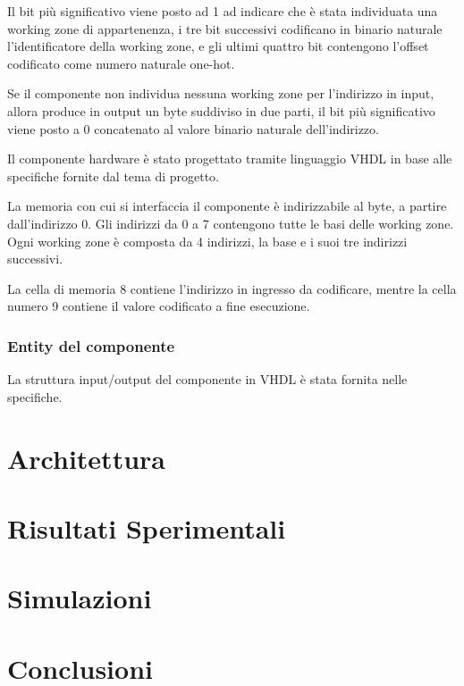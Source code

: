 \documentclass{article}
\begin{document}
 Il bit più significativo viene posto ad 1 ad indicare che è stata individuata una working zone di appartenenza, i tre bit successivi codificano in binario naturale l'identificatore della working zone, e gli ultimi quattro bit contengono l'offset codificato come numero naturale one-hot.

Se il componente non individua nessuna working zone per l'indirizzo in input, allora produce in output un byte suddiviso in due parti, il bit più significativo viene posto a 0 concatenato al valore binario naturale dell'indirizzo.

Il componente hardware è stato progettato tramite linguaggio VHDL in base alle specifiche fornite dal tema di progetto.

La memoria con cui si interfaccia il componente è indirizzabile al byte, a partire dall'indirizzo 0. Gli indirizzi da 0 a 7 contengono tutte le basi delle working zone. Ogni working zone è composta da 4 indirizzi, la base e i suoi tre indirizzi successivi.

La cella di memoria 8 contiene l'indirizzo in ingresso da codificare, mentre la cella numero 9 contiene il valore codificato a fine esecuzione.

\subsubsection{Entity del componente}

La struttura input/output del componente in VHDL è stata fornita nelle specifiche.









\section{Architettura}

\section{Risultati Sperimentali}

\section{Simulazioni}

\section{Conclusioni}
\end{document}
